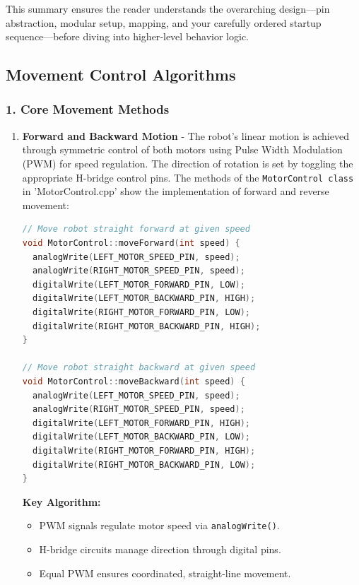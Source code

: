 \documentclass[conference]{IEEEtran}
\begin{document}
This summary ensures the reader understands the overarching design—pin abstraction, modular setup, mapping, and your carefully ordered startup sequence—before diving into higher‑level behavior logic.


\subsection{Movement Control Algorithms}

\subsubsection*{\textbf{1. Core Movement Methods}}

\begin{enumerate}[label=\alph*)]

\item \textbf{Forward and Backward Motion} - The robot’s linear motion is achieved through symmetric control of both motors using Pulse Width Modulation (PWM) for speed regulation. The direction of rotation is set by toggling the appropriate H-bridge control pins. The methods of the \texttt{MotorControl class} in 'MotorControl.cpp' show the implementation of forward and reverse movement:

\begin{lstlisting}[language=C++, caption=Forward and backward movement functions]
// Move robot straight forward at given speed
void MotorControl::moveForward(int speed) {
  analogWrite(LEFT_MOTOR_SPEED_PIN, speed);
  analogWrite(RIGHT_MOTOR_SPEED_PIN, speed);
  digitalWrite(LEFT_MOTOR_FORWARD_PIN, LOW);
  digitalWrite(LEFT_MOTOR_BACKWARD_PIN, HIGH);
  digitalWrite(RIGHT_MOTOR_FORWARD_PIN, LOW);
  digitalWrite(RIGHT_MOTOR_BACKWARD_PIN, HIGH);
}

// Move robot straight backward at given speed
void MotorControl::moveBackward(int speed) {
  analogWrite(LEFT_MOTOR_SPEED_PIN, speed);
  analogWrite(RIGHT_MOTOR_SPEED_PIN, speed);
  digitalWrite(LEFT_MOTOR_FORWARD_PIN, HIGH);
  digitalWrite(LEFT_MOTOR_BACKWARD_PIN, LOW);
  digitalWrite(RIGHT_MOTOR_FORWARD_PIN, HIGH);
  digitalWrite(RIGHT_MOTOR_BACKWARD_PIN, LOW);
}
\end{lstlisting}

\textbf{Key Algorithm:}
\begin{itemize}
  \item PWM signals regulate motor speed via \verb|analogWrite()|.
  \item H-bridge circuits manage direction through digital pins.
  \item Equal PWM ensures coordinated, straight-line movement.
\end{itemize}


\end{enumerate}
\end{document}
